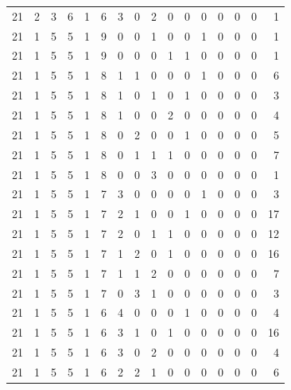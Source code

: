 \begin{appendix}
{\begin{longtable}{lrrrrrrrrrrrrrrr}
    21        & 2  & 3  & 6  & 1  & 6  & 3  & 0  & 2  & 0  & 0  & 0  & 0   & 0   & 0   & 1    \\
    21        & 1  & 5  & 5  & 1  & 9  & 0  & 0  & 1  & 0  & 0  & 1  & 0   & 0   & 0   & 1    \\
    21        & 1  & 5  & 5  & 1  & 9  & 0  & 0  & 0  & 1  & 1  & 0  & 0   & 0   & 0   & 1    \\
    21        & 1  & 5  & 5  & 1  & 8  & 1  & 1  & 0  & 0  & 0  & 1  & 0   & 0   & 0   & 6    \\
    21        & 1  & 5  & 5  & 1  & 8  & 1  & 0  & 1  & 0  & 1  & 0  & 0   & 0   & 0   & 3    \\
    21        & 1  & 5  & 5  & 1  & 8  & 1  & 0  & 0  & 2  & 0  & 0  & 0   & 0   & 0   & 4    \\
    21        & 1  & 5  & 5  & 1  & 8  & 0  & 2  & 0  & 0  & 1  & 0  & 0   & 0   & 0   & 5    \\
    21        & 1  & 5  & 5  & 1  & 8  & 0  & 1  & 1  & 1  & 0  & 0  & 0   & 0   & 0   & 7    \\
    21        & 1  & 5  & 5  & 1  & 8  & 0  & 0  & 3  & 0  & 0  & 0  & 0   & 0   & 0   & 1    \\
    21        & 1  & 5  & 5  & 1  & 7  & 3  & 0  & 0  & 0  & 0  & 1  & 0   & 0   & 0   & 3    \\
    21        & 1  & 5  & 5  & 1  & 7  & 2  & 1  & 0  & 0  & 1  & 0  & 0   & 0   & 0   & 17   \\
    21        & 1  & 5  & 5  & 1  & 7  & 2  & 0  & 1  & 1  & 0  & 0  & 0   & 0   & 0   & 12   \\
    21        & 1  & 5  & 5  & 1  & 7  & 1  & 2  & 0  & 1  & 0  & 0  & 0   & 0   & 0   & 16   \\
    21        & 1  & 5  & 5  & 1  & 7  & 1  & 1  & 2  & 0  & 0  & 0  & 0   & 0   & 0   & 7    \\
    21        & 1  & 5  & 5  & 1  & 7  & 0  & 3  & 1  & 0  & 0  & 0  & 0   & 0   & 0   & 3    \\
    21        & 1  & 5  & 5  & 1  & 6  & 4  & 0  & 0  & 0  & 1  & 0  & 0   & 0   & 0   & 4    \\
    21        & 1  & 5  & 5  & 1  & 6  & 3  & 1  & 0  & 1  & 0  & 0  & 0   & 0   & 0   & 16   \\
    21        & 1  & 5  & 5  & 1  & 6  & 3  & 0  & 2  & 0  & 0  & 0  & 0   & 0   & 0   & 4    \\
    21        & 1  & 5  & 5  & 1  & 6  & 2  & 2  & 1  & 0  & 0  & 0  & 0   & 0   & 0   & 6    \\

\end{longtable}}
\end{appendix}
